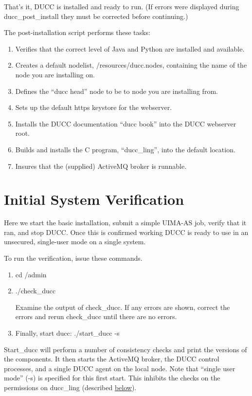 That's it, DUCC is installed and ready to run. (If errors were displayed during ducc\_post\_install
they must be corrected before continuing.)

The post-installation script performs these tasks:
\begin{enumerate}
    \item Verifies that the correct level of Java and Python are installed and available.
    \item Creates a default nodelist, \duccruntime/resources/ducc.nodes, containing the name of the node you are installing on.
    \item Defines the ``ducc head'' node to be to node you are installing from.
    \item Sets up the default https keystore for the webserver.
    \item Installs the DUCC documentation ``ducc book'' into the DUCC webserver root.
    \item Builds and installs the C program, ``ducc\_ling'', into the default location.
    \item Insures that the (supplied) ActiveMQ broker is runnable.
\end{enumerate}

\section{Initial System Verification}

Here we start the basic installation, submit a simple UIMA-AS job, verify that it ran, and stop
DUCC.  Once this is confirmed working DUCC is ready to use in an unsecured, single-user mode on a
single system.

To run the verification, issue these commands.
\begin{enumerate}
  \item cd \duccruntime/admin 
  \item ./check\_ducc
  
    Examine the output of check\_ducc.  If any errors are shown, correct the errors and rerun
    check\_ducc until there are no errors.  
  \item Finally, start ducc: ./start\_ducc -s
  \end{enumerate}
  
  Start\_ducc will perform a number of consistency checks and print the versions of the components.
  It then starts the ActiveMQ broker, the DUCC control processes, and a single DUCC agent on the
  local node.  Note that ``single user mode'' (-s) is specified for this first start.  This inhibits
  the checks on the permissions on ducc\_ling (described \hyperref[sec:duccling]{below}).

